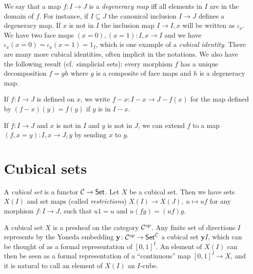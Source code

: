 \documentclass[10pt,a4paper]{article}
\newcommand{\CC}{{\mathcal C}}
\newcommand{\yoneda}{\mathbf{y}}
\begin{document}
 We say that a map $f:I\to J$ is a {\em degeneracy map} if{f} all elements in $I$ are in
the domain of $f$. For instance, if $I\subseteq J$ the canonical inclusion $I \to J$ defines
a degeneracy map. If $x$ is not in $I$ the inclusion map $I \to I,x$ will be written as $\iota_x.$
We have two face maps $(x=0), (x=1):I,x\to I$ and we
have $\iota_x(x=0) = \iota_x(x=1) = 1_I$, which is one example of a \emph{cubical identity}.
There are many more cubical identities, often implicit in the notations. We also have
the following result (cf.\ simplicial sets): every morphism $f$ has a unique decomposition
$f=gh$ where $g$ is a composite of face maps and $h$ is a degeneracy map.

 If $f:I\to J$ is defined on $x$, we write $f-x:I-x \to J-{f(x)}$ for the map defined by
$(f-x)(y) = f(y)$ if $y$ is in $I-x.$

If $f:I\to J$ and $x$ is not in $I$ and $y$ is not in $J$, we can
extend $f$ to a map $(f,x=y):I,x\to J,y$ by sending $x$ to $y$.

\section{Cubical sets}

A \emph{cubical set} is a functor $\CC\to{\sf Set}$.  Let $X$ be a
cubical set. Then we have sets $X(I)$ and set maps (called
\emph{restrictions}) $X(I)\to X(J),~u\longmapsto uf$ for any morphism
$f:I\to J$, such that $u1 = u$ and $u(fg) = (uf)g$.

\medskip

A cubical set $X$ is a presheaf on the category ${\cal C}^{op}$. Any
finite set of directions $I$ represents by the Yoneda embedding
$\yoneda \colon {\cal C}^{op} \to {\sf Set}^{\cal C}$ a cubical set
$\yoneda I$, which can be thought of as a formal representation of
$[0,1]^I$.  An element of $X(I)$ can then be seen as a formal
representation of a ``continuous'' map $[0,1]^I\to X$, and it is
natural to call an element of $X(I)$ an $I$-cube.
\end{document}
